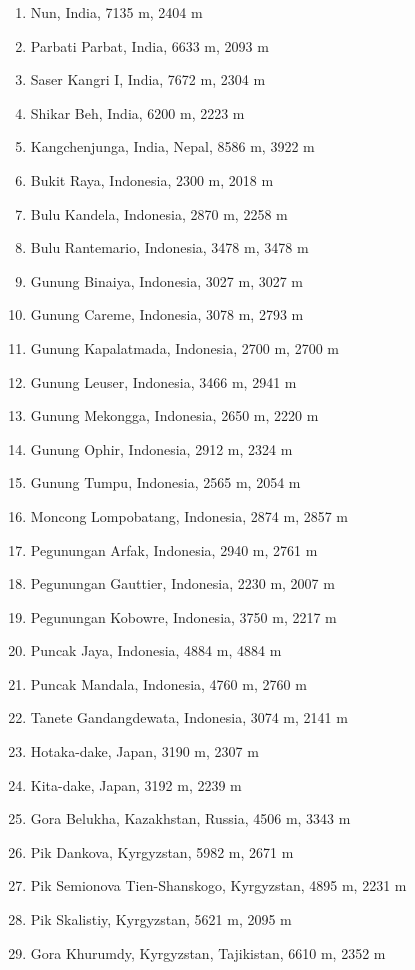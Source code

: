 \documentclass[10pt,twocolumn,letterpaper]{article}
\begin{document}
\begin{flushleft}
\begin{enumerate}
    \item Nun, India, 7135 m, 2404 m
    \item Parbati Parbat, India, 6633 m, 2093 m
    \item Saser Kangri I, India, 7672 m, 2304 m
    \item Shikar Beh, India, 6200 m, 2223 m
    \item Kangchenjunga, India, Nepal, 8586 m, 3922 m
    \item Bukit Raya, Indonesia, 2300 m, 2018 m
    \item Bulu Kandela, Indonesia, 2870 m, 2258 m
    \item Bulu Rantemario, Indonesia, 3478 m, 3478 m
    \item Gunung Binaiya, Indonesia, 3027 m, 3027 m
    \item Gunung Careme, Indonesia, 3078 m, 2793 m
    \item Gunung Kapalatmada, Indonesia, 2700 m, 2700 m
    \item Gunung Leuser, Indonesia, 3466 m, 2941 m
    \item Gunung Mekongga, Indonesia, 2650 m, 2220 m
    \item Gunung Ophir, Indonesia, 2912 m, 2324 m
    \item Gunung Tumpu, Indonesia, 2565 m, 2054 m
    \item Moncong Lompobatang, Indonesia, 2874 m, 2857 m
    \item Pegunungan Arfak, Indonesia, 2940 m, 2761 m
    \item Pegunungan Gauttier, Indonesia, 2230 m, 2007 m
    \item Pegunungan Kobowre, Indonesia, 3750 m, 2217 m
    \item Puncak Jaya, Indonesia, 4884 m, 4884 m
    \item Puncak Mandala, Indonesia, 4760 m, 2760 m
    \item Tanete Gandangdewata, Indonesia, 3074 m, 2141 m
    \item Hotaka-dake, Japan, 3190 m, 2307 m
    \item Kita-dake, Japan, 3192 m, 2239 m
    \item Gora Belukha, Kazakhstan, Russia, 4506 m, 3343 m
    \item Pik Dankova, Kyrgyzstan, 5982 m, 2671 m
    \item Pik Semionova Tien-Shanskogo, Kyrgyzstan, 4895 m, 2231 m
    \item Pik Skalistiy, Kyrgyzstan, 5621 m, 2095 m
    \item Gora Khurumdy, Kyrgyzstan, Tajikistan, 6610 m, 2352 m

\end{enumerate}
\end{flushleft}
\end{document}
